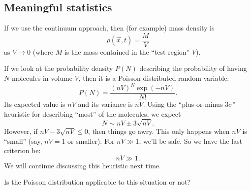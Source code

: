 \subsection*{Meaningful statistics}

\begin{node}
  If we use the continuum approach, then (for example) mass density is
  \begin{equation}
\rho(\vec{x},t)=\frac{M}{V}
  \end{equation}
  as $V\to 0$ (where $M$ is the mass contained in the ``test region'' $V$).
\end{node}

\begin{node}
If we look at the probability density $P(N)$ describing the
probability of having $N$ molecules in volume $V$, then it is a
Poisson-distributed random variable:
\begin{equation}
P(N) = \frac{(nV)^{N}\exp(-nV)}{N!}.
\end{equation}
Its expected value is $nV$ and its variance is $nV$. Using the
``plus-or-minus $3\sigma$'' heuristic for describing ``most'' of the
molecules, we expect
\begin{equation}
N\sim nV\pm 3\sqrt{nV}.
\end{equation}
However, if $nV-3\sqrt{nV}\leq0$, then things go awry. This only
happens when $nV$ is ``small'' (say, $nV=1$ or smaller). For $nV\gg1$,
we'll be safe. So we have the last criterion be:
\begin{equation}
nV\gg1.
\end{equation}
We will continue discussing this heuristic next time.
\end{node}

\begin{xca}
Is the Poisson distribution applicable to this situation or not?
\end{xca}

\endinput